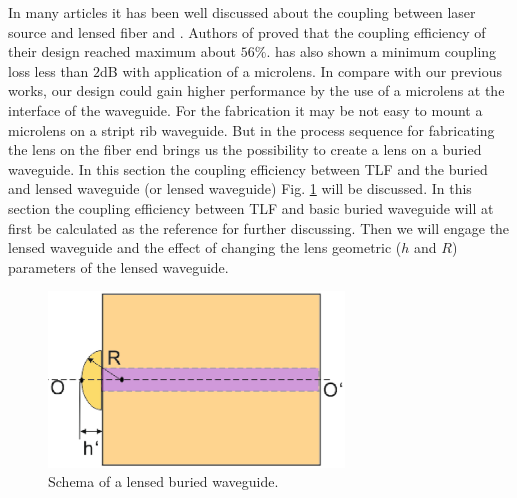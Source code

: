 In many articles it has been well discussed about the coupling between laser source and lensed fiber\cite{microlensese_to_fiber_coupling} and \cite{integrated_coupling _between_LD_SMF}. Authors of \cite{microlensese_to_fiber_coupling}  proved that  the coupling efficiency of their design reached maximum about $56\%$. \cite{integrated_coupling _between_LD_SMF} has also shown a minimum coupling loss less than $2$dB with application of a microlens. In compare with our previous works, our design could gain higher performance by the use of a microlens at the interface of the waveguide. For the fabrication it may be not easy to mount a microlens on a stript rib waveguide. But in \cite{lens_end_manufacture} the process sequence for fabricating the lens on the fiber end brings us the possibility to create a lens on a buried waveguide. In this section the coupling efficiency between TLF and the buried and lensed waveguide (or lensed waveguide) Fig. \ref{fig:lensed_waveguide} will be discussed. In this section the coupling efficiency between TLF and basic buried waveguide will at first be calculated as the reference for further discussing. Then we will engage the lensed waveguide and the effect of changing the lens geometric ($h$ and $R$) parameters of the lensed waveguide. 
\begin{figure}[!ht]
\centering
\includegraphics[width=0.7\textwidth]{bilder/lensed_waveguide}
\caption{Schema of a lensed buried waveguide.}
\label{fig:lensed_waveguide}
\end{figure}